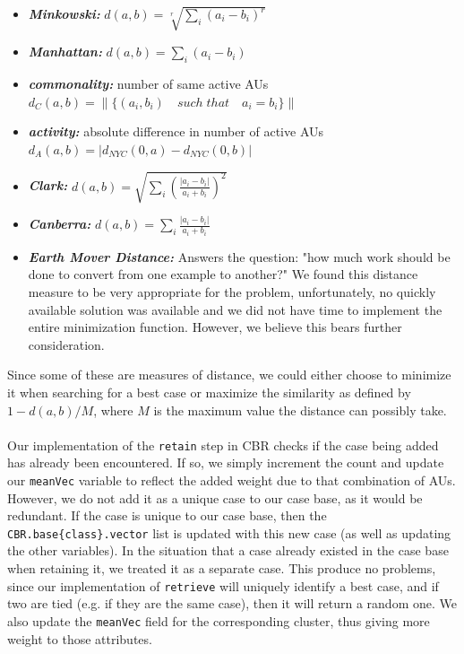 \documentclass[a4paper,12pt,oneside,final]{report}
\begin{document}
\begin{itemize}
\item {\bf\textit{Minkowski:}} $d(a,b) = \sqrt[r]{\sum_i (a_i - b_i)^r}$
\item {\bf\textit{Manhattan:}} $d(a,b) = \sum_i (a_i - b_i)$
\item {\bf\textit{commonality:}} number of same active AUs $d_C(a, b) = \|\{(a_i, b_i) \quad such\; that \quad a_i = b_i\}\|$
\item {\bf\textit{activity:}} absolute difference in number of active AUs $d_A(a,b) = |d_{NYC}(0, a) - d_{NYC}(0, b)|$
\item {\bf\textit{Clark:}} $d(a, b) = \sqrt{\sum_i \left( \frac{|a_i - b_i|}{a_i + b_i} \right)^2}$
\item {\bf\textit{Canberra:}} $d(a, b) = \sum_i \frac{|a_i - b_i|}{a_i + b_i}$
\item {\bf\textit{Earth Mover Distance:}} Answers the question: "how much work should be done to convert from one example to another?" We found this distance measure to be very appropriate for the problem, unfortunately, no quickly available solution was available and we did not have time to implement the entire minimization function.  However, we believe this bears further consideration.
\end{itemize}
Since some of these are measures of distance, we could either choose to minimize it when searching for a best case or maximize the similarity as defined by $1 - {d(a,b)}/M$, where $M$ is the maximum value the distance can possibly take.

\paragraph{}
Our implementation of the \verb+retain+ step in CBR checks if the case being added has already been encountered.  If so, we simply increment the count and update our \verb+meanVec+ variable to reflect the added weight due to that combination of AUs.  However, we do not add it as a unique case to our case base, as it would be redundant.  If the case is unique to our case base, then the \verb+CBR.base{class}.vector+ list is updated with this new case (as well as updating the other variables).  In the situation that a case already existed in the case base when retaining it, we treated it as a separate case.  This produce no problems, since our implementation of \verb+retrieve+ will uniquely identify a best case, and if two are tied (e.g. if they are the same case), then it will return a random one.  We also update the \verb+meanVec+ field for the corresponding cluster, thus giving more weight to those attributes.
\end{document}
